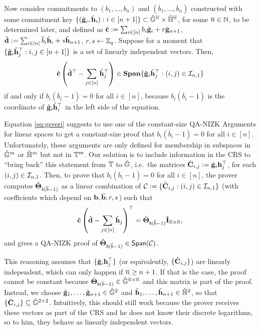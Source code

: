 Now consider commitments to $(b_1,\ldots,b_n)$ and $(\overline{b}_1,\ldots,\overline{b}_n)$ constructed with some commitment key $\{(\hat{\mathbf{g}}_i,\check{\mathbf{h}}_i): i \in [n+1]\}\subset{\ensuremath{\hat{\mathbb{G}}}}^{{\overline{n}}}\times{\ensuremath{\check{\mathbb{H}}}}^{\overline{n}}$, for some ${\overline{n}}\in\mathbb{N}$, to be determined later, and defined as $\hat{\mathbf{c}}:=\sum_{i \in [n]} b_i \hat{\mathbf{g}}_i + r \hat{\mathbf{g}}_{n+1}$, 
$\check{\mathbf{d}}:=\sum_{i \in [n]} \overline{b}_i \check{\mathbf{h}}_i + s \check{\mathbf{h}}_{n+1}$, $r,s \gets \mathbb{Z}_q$. Suppose for a moment that 
$\{ \hat{\mathbf{g}}_{i} \check{\mathbf{h}}_{j}^{\top} : i,j \in [n+1]\}$ 
is a set of linearly independent vectors. Then,  
\begin{equation} \label{eq:gsveri}
\hat{\mathbf{c}} \left(\check{\mathbf{d}}^{\top}-
\sum_{j\in[n]} \check{\mathbf{h}}_j^{\top}\right) \in \mathbf{Span}\{ \hat{\mathbf{g}}_i\check{\mathbf{h}}_j^{\top}: (i,j)\in\mathcal{I}_{n,1} \} 
\end{equation}
if and only if $b_i(\overline{b}_i-1)=0$ for all $i \in [n]$,
because $b_i(\overline{b}_i-1)$ is the coordinate of 
$\hat{\mathbf{g}}_i\check{\mathbf{h}}_i^{\top}$ in the left side of the equation.


Equation \ref{eq:gsveri} suggests to use one of the constant-size QA-NIZK Arguments for linear spaces to get a constant-size proof that $b_i(\overline{b}_i-1)=0$ for all $i \in [n]$. Unfortunately, these arguments are only defined for membership in subspaces  in 
${\hat{\mathbb{G}}}^m$ or ${\check{\mathbb{H}}}^m$ but not in $\mathbb{T}^m$. Our solution is to include information in the CRS to ``bring back'' 
  this statement from $\mathbb{T}$ to ${\hat{\mathbb{G}}}$, i.e.\ 
  the matrices   $\hat{\mathbf{{C}}}_{i,j}:=\hat{\mathbf{g}}_i\mathbf{h}_j^{\top}$, for each $(i,j)\in\mathcal{I}_{n,1}$.   
Then, to prove that $b_i(\overline{b}_i-1)=0$ for all $i\in [n]$, the prover computes 
$\hat{\mathbf{{\Theta}}}_{b(\overline{b}-1)}$ as a linear combination of 
 $\mathcal{C}:=\{\hat{\mathbf{{C}}}_{i,j}: (i,j)\in\mathcal{I}_{n,1}\}$ (with coefficients which depend on
 $\mathbf{b},\mathbf{\overline{b}},r,s$)
 such that
\begin{equation}
\hat{\mathbf{c}}\left(\check{\mathbf{d}}-
\sum_{j\in[n]}\check{\mathbf{h}}_j\right)^{\top}=
{\hat{\mathbf{{\Theta}}}}_{b(\overline{b}-1)}\check{\mathbf{{I}}}_{{\overline{n}}\times{\overline{n}}},
\end{equation}
and gives a QA-NIZK proof of  ${\hat{\mathbf{{\Theta}}}}_{b(\overline{b}-1)} \in \mathsf{Span}(\mathcal{C})$.

This reasoning assumes that $\{\hat{\mathbf{g}}_i \mathbf{h}_j^{\top}\}$ (or equivalently, $\{\hat{\mathbf{{C}}}_{i,j}\}$) are linearly independent,  which can only happen if 
${\overline{n}} \geq n+1$. If that is the case, the proof cannot be constant because ${\hat{\mathbf{{\Theta}}}}_{b(\bar{b}-1)} \in {\ensuremath{\hat{\mathbb{G}}}}^{{\overline{n}}\times{\overline{n}}}$ and this matrix is part of the proof. Instead, we choose $\hat{\mathbf{g}}_1,\ldots,\hat{\mathbf{g}}_{n+1} \in {\ensuremath{\hat{\mathbb{G}}}}^{2}$ and $\check{\mathbf{h}}_1,\ldots,\check{\mathbf{h}}_{n+1} \in {\ensuremath{\check{\mathbb{H}}}}^{2}$, so that 
$\{\hat{\mathbf{{C}}}_{i,j}\} \subseteq {\ensuremath{\hat{\mathbb{G}}}}^{2 \times 2}$.  Intuitively, this should still work because the prover receives these vectors as part of the CRS and he does not know their discrete logarithms, so to him, they behave as linearly independent vectors.  

